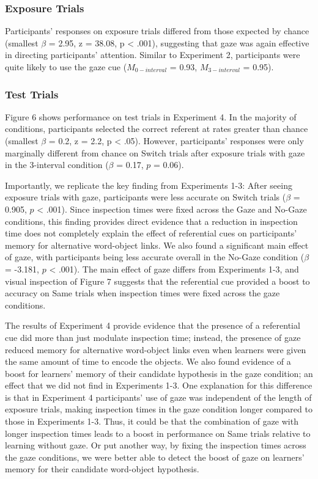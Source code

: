 \documentclass[authoryear, review]{elsarticle}
\begin{document}
\subsubsection{Exposure Trials}\label{exposure-trials-3}

Participants' responses on exposure trials differed from those expected
by chance (smallest \(\beta\) = 2.95, z = 38.08, p \textless{} .001),
suggesting that gaze was again effective in directing participants'
attention. Similar to Experiment 2, participants were quite likely to
use the gaze cue (\(M_{0-interval}\) = 0.93, \(M_{3-interval}\) = 0.95).

\subsubsection{Test Trials}\label{test-trials-3}

Figure 6 shows performance on test trials in Experiment 4. In the
majority of conditions, participants selected the correct referent at
rates greater than chance (smallest \(\beta\) = 0.2, z = 2.2, p
\textless{} .05). However, participants' responses were only marginally
different from chance on Switch trials after exposure trials with gaze
in the 3-interval condition (\(\beta\) = 0.17, \(p\) = 0.06).

Importantly, we replicate the key finding from Experiments 1-3: After
seeing exposure trials with gaze, participants were less accurate on
Switch trials (\(\beta\) = 0.905, \(p\) \textless{} .001). Since
inspection times were fixed across the Gaze and No-Gaze conditions, this
finding provides direct evidence that a reduction in inspection time
does not completely explain the effect of referential cues on
participants' memory for alternative word-object links. We also found a
significant main effect of gaze, with participants being less accurate
overall in the No-Gaze condition (\(\beta\) = -3.181, \(p\) \textless{}
.001). The main effect of gaze differs from Experiments 1-3, and visual
inspection of Figure 7 suggests that the referential cue provided a
boost to accuracy on Same trials when inspection times were fixed across
the gaze conditions.

The results of Experiment 4 provide evidence that the presence of a
referential cue did more than just modulate inspection time; instead,
the presence of gaze reduced memory for alternative word-object links
even when learners were given the same amount of time to encode the
objects. We also found evidence of a boost for learners' memory of their
candidate hypothesis in the gaze condition; an effect that we did not
find in Experiments 1-3. One explanation for this difference is that in
Experiment 4 participants' use of gaze was independent of the length of
exposure trials, making inspection times in the gaze condition longer
compared to those in Experiments 1-3. Thus, it could be that the
combination of gaze with longer inspection times leads to a boost in
performance on Same trials relative to learning without gaze. Or put
another way, by fixing the inspection times across the gaze conditions,
we were better able to detect the boost of gaze on learners' memory for
their candidate word-object hypothesis.
\end{document}
